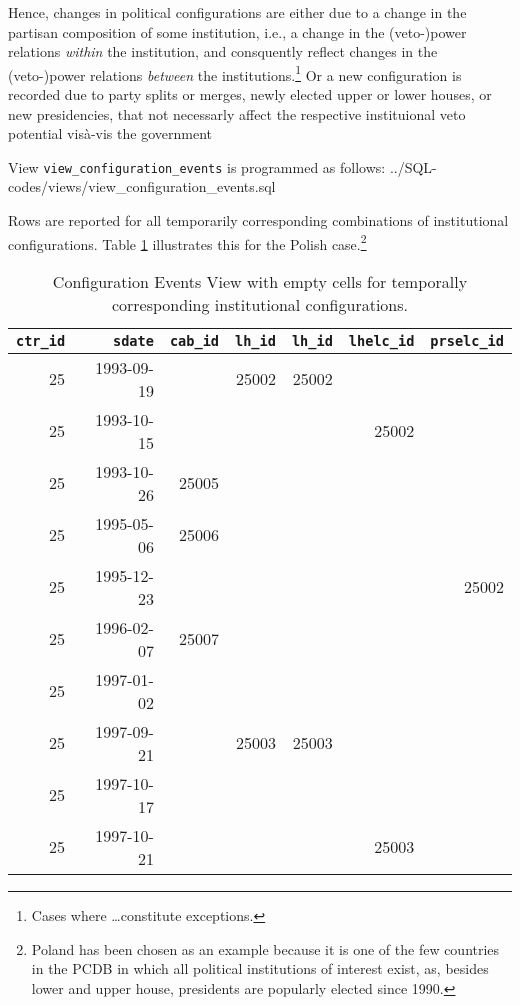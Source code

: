 Hence, changes in political configurations are either due to a change in the partisan composition of some institution, i.e., a change in the (veto-)power relations \emph{within} the institution, and consquently reflect changes in the (veto-)power relations \emph{between} the institutions.\footnote{Cases where \ldots constitute exceptions.}
Or a new configuration is recorded due to party splits or merges, newly elected upper or lower houses, or new presidencies, that not necessarly affect the respective instituional veto potential vis\`a-vis the government

View \texttt{view\_configuration\_events} is programmed as follows:
%
{../SQL-codes/views/view_configuration_events.sql}

Rows are reported for all temporarily corresponding combinations of institutional configurations. 
Table \ref{tab_view_config_events_empty_cells}  illustrates this for the Polish case.\footnote{%
Poland has been chosen as an example because it is one of the few countries in the PCDB in which all political institutions of interest exist, as, besides lower and upper house, presidents are popularly elected since 1990.}

\begin{table}[h!]
\centering\footnotesize
\caption{Configuration Events View with empty cells for temporally corresponding institutional configurations.}
\label{tab_view_config_events_empty_cells}
\begin{tabular}{r r r r r r r}
\tabularnewline\toprule\toprule
\multicolumn{1}{r}{\texttt{ctr\_id}}	&
\multicolumn{1}{r}{\texttt{sdate}}	&	
\multicolumn{1}{r}{\texttt{cab\_id}}	&
\multicolumn{1}{r}{\texttt{lh\_id}}	&
\multicolumn{1}{r}{\texttt{lh\_id}}	&	
\multicolumn{1}{r}{\texttt{lhelc\_id}}	&	
\multicolumn{1}{r}{\texttt{prselc\_id}}	\\\midrule
25	&	1993-09-19	&		&	25002	&	25002	&		&		\\
25	&	1993-10-15	&		&		&		&	25002	&		\\
25	&	1993-10-26	&	25005	&		&		&		&		\\
25	&	1995-05-06	&	25006	&		&		&		&		\\
25	&	1995-12-23	&		&		&		&		&	25002	\\
25	&	1996-02-07	&	25007	&		&		&		&		\\
25	&	1997-01-02	&		&		&		&		&		\\
25	&	1997-09-21	&		&	25003	&	25003	&		&		\\
25	&	1997-10-17	&		&		&		&		&		\\
25	&	1997-10-21	&		&		&		&	25003	&		\\\bottomrule\bottomrule
\end{tabular}
\end{table}

